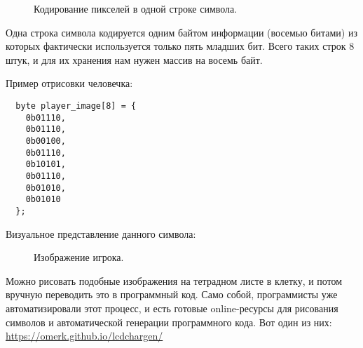 \documentclass[../sparc.tex]{subfiles}
\begin{document}
\begin{figure}[ht]
  \centering
  \caption{Кодирование пикселей в одной строке символа.}
  \label{fig:game-dev-char-symbol-encoding}
\end{figure}

Одна строка символа кодируется одним байтом информации (восемью битами) из
которых фактически используется только пять младших бит.  Всего таких строк 8
штук, и для их хранения нам нужен массив на восемь байт.

Пример отрисовки человечка:

\begin{verbatim}
  byte player_image[8] = {
    0b01110,
    0b01110,
    0b00100,
    0b01110,
    0b10101,
    0b01110,
    0b01010,
    0b01010
  };
\end{verbatim}

Визуальное представление данного символа:

\begin{figure}[ht]
  \centering
  \caption{Изображение игрока.}
  \label{fig:game-dev-char-symbol-example}
\end{figure}

Можно рисовать подобные изображения на тетрадном листе в клетку, и потом вручную
переводить это в программный код.  Само собой, программисты уже автоматизировали
этот процесс, и есть готовые online-ресурсы для рисования символов и
автоматической генерации программного кода.  Вот один из них:
\url{https://omerk.github.io/lcdchargen/}
\end{document}
